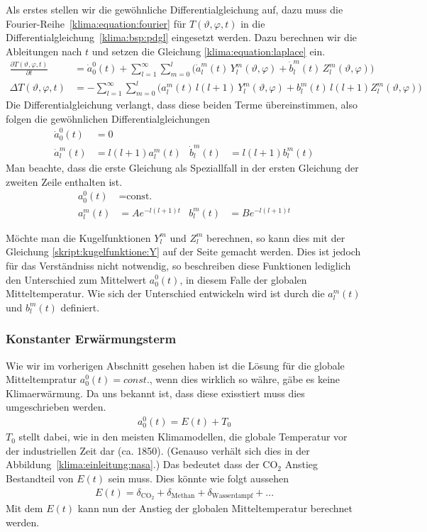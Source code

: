 \begin{refsection}
Als erstes stellen wir die gewöhnliche Differentialgleichung auf, dazu muss die Fourier-Reihe~\eqref{klima:equation:fourier} für $T(\vartheta ,\varphi ,t)$ in die Differentialgleichung~\eqref{klima:bsp:pdgl} eingesetzt werden.
Dazu berechnen wir die Ableitungen nach $t$ und setzen die Gleichung \eqref{klima:equation:laplace} ein.
\begin{align*}
\frac{\partial T(\vartheta ,\varphi ,t)}{\partial t} &=
\dot{a}^0_0(t)+\sum_{l=1}^\infty\sum_{m=0}^l \bigl( \dot{a}^m_l(t)\,Y^m_l(\vartheta ,\varphi)+\dot{b}^m_l(t)\,Z^m_l(\vartheta ,\varphi)\bigr)
\\
\Delta T(\vartheta ,\varphi ,t) &=
- \sum_{l=1}^\infty\sum_{m=0}^l \bigl( a^m_l(t)\,l(l+1)\,Y^m_l(\vartheta ,\varphi)+b^m_l(t)\,l(l+1)Z^m_l(\vartheta ,\varphi)\bigr)
\end{align*}
Die Differentialgleichung verlangt, dass diese beiden Terme übereinstimmen, also folgen die gewöhnlichen Differentialgleichungen
\begin{align*}
\dot a^0_0(t)&= 0
\\
\dot a^m_l(t)&=l(l+1)a^m_l(t)&
\dot b^m_l(t)&=l(l+1)b^m_l(t)
\end{align*}
Man beachte, dass die erste Gleichung als Speziallfall in der ersten
Gleichung der zweiten Zeile enthalten ist.
\begin{align*}
a^0_0(t)&=\text{const.}
\\
a^m_l(t) &=Ae^{-l(l+1)t}&
b^m_l(t) &=Be^{-l(l+1)t}
\end{align*}

Möchte man die Kugelfunktionen $Y^m_l$ und $Z^m_l$ berechnen, so kann dies mit der Gleichung \eqref{skript:kugelfunktione:Y} auf der Seite \pageref{skript:kugelfunktione:Y} gemacht werden. Dies ist jedoch für das Verständniss nicht notwendig, so beschreiben diese Funktionen lediglich den Unterschied zum Mittelwert $a^0_0(t)$, in diesem Falle der globalen Mitteltemperatur. Wie sich der Unterschied entwickeln wird ist durch die $a^m_l(t)$ und $b^m_l(t)$ definiert.


\subsubsection{Konstanter Erwärmungsterm
\label{klima:subsubsection:erwaermungsterm}}
Wie wir im vorherigen Abschnitt gesehen haben ist die Lösung für die globale Mitteltempratur $a^0_0(t)=const.$, wenn dies wirklich so währe, gäbe es keine Klimaerwärmung. Da uns bekannt ist, dass diese exisstiert muss dies umgeschrieben werden.
\begin{align}
a^0_0(t)=E(t)+ T_0
\end{align}
$T_0$ stellt dabei, wie in den meisten Klimamodellen, die globale Temperatur vor der industriellen Zeit dar (ca. 1850). (Genauso verhält sich dies in der Abbildung~\ref{klima:einleitung:nasa}.) Das bedeutet dass der CO$_2$ Anstieg Bestandteil von $E(t)$ sein muss. Dies könnte wie folgt aussehen 
\begin{align}
E(t)=\delta_{\text{CO}_2}+\delta_{\text{Methan}}+\delta_{\text{Wasserdampf}}+...
\end{align}
Mit dem $E(t)$ kann nun der Anstieg der globalen Mitteltemperatur berechnet werden.



\end{refsection}
